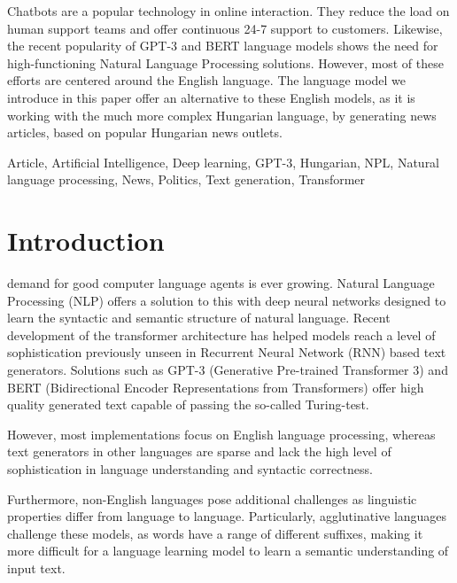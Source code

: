 \documentclass[journal]{IEEEtai}
\begin{document}
\begin{IEEEImpStatement}
Chatbots are a popular technology in online interaction. They reduce the load on human support teams and offer continuous 24-7 support to customers. Likewise, the recent popularity of GPT-3 and BERT language models shows the need for high-functioning Natural Language Processing solutions. However, most of these efforts are centered around the English language. The language model we introduce in this paper offer an alternative to these English models, as it is working with the much more complex Hungarian language, by generating news articles, based on popular Hungarian news outlets.
\end{IEEEImpStatement}

\begin{IEEEkeywords}
Article, Artificial Intelligence, Deep learning, GPT-3, Hungarian, NPL, Natural language processing, News, Politics, Text generation, Transformer
\end{IEEEkeywords}



\section{Introduction}

 demand for good computer language agents is ever growing. Natural Language Processing (NLP) offers a solution to this with deep neural networks designed to learn the syntactic and semantic structure of natural language. Recent development of the transformer architecture\cite{vaswani2017attention} has helped models reach a level of sophistication previously unseen in Recurrent Neural Network (RNN) based text generators. Solutions such as GPT-3\cite{brown2020language} (Generative Pre-trained Transformer 3) and BERT\cite{devlin2019bert} (Bidirectional Encoder Representations from Transformers) offer high quality generated text capable of passing the so-called Turing-test\cite{TuringMind}.

However, most implementations focus on English language processing, whereas text generators in other languages are sparse and lack the high level of sophistication in language understanding and syntactic correctness. 

Furthermore, non-English languages pose additional challenges as linguistic properties differ from language to language. Particularly, agglutinative languages challenge these models, as words have a range of different suffixes, making it more difficult for a language learning model to learn a semantic understanding of input text.
\end{document}
